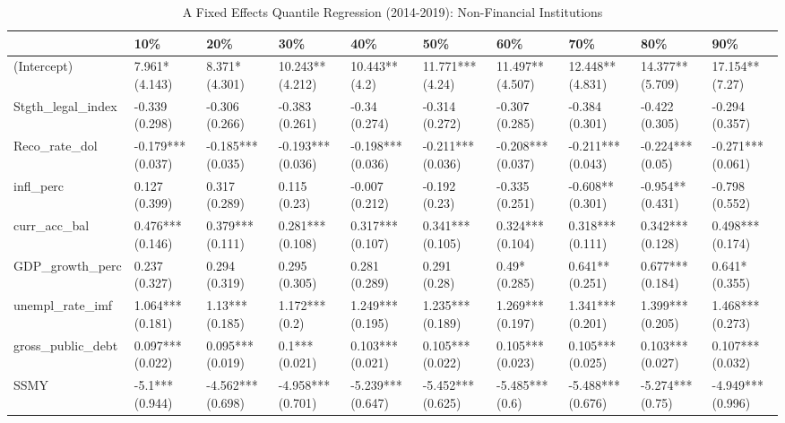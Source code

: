 \begin{table}[ht]
\centering
\caption{A Fixed Effects Quantile Regression (2014-2019): Non-Financial Institutions} 
\begingroup\small
\begin{tabular}{llllllllll}
  \toprule
 & 10\% & 20\% & 30\% & 40\% & 50\% & 60\% & 70\% & 80\% & 90\% \\ 
  \midrule
(Intercept) & 7.961* (4.143) & 8.371* (4.301) & 10.243** (4.212) & 10.443** (4.2) & 11.771*** (4.24) & 11.497** (4.507) & 12.448** (4.831) & 14.377** (5.709) & 17.154** (7.27) \\ 
  Stgth\_legal\_index & -0.339 (0.298) & -0.306 (0.266) & -0.383 (0.261) & -0.34 (0.274) & -0.314 (0.272) & -0.307 (0.285) & -0.384 (0.301) & -0.422 (0.305) & -0.294 (0.357) \\ 
  Reco\_rate\_dol & -0.179*** (0.037) & -0.185*** (0.035) & -0.193*** (0.036) & -0.198*** (0.036) & -0.211*** (0.036) & -0.208*** (0.037) & -0.211*** (0.043) & -0.224*** (0.05) & -0.271*** (0.061) \\ 
  infl\_perc & 0.127 (0.399) & 0.317 (0.289) & 0.115 (0.23) & -0.007 (0.212) & -0.192 (0.23) & -0.335 (0.251) & -0.608** (0.301) & -0.954** (0.431) & -0.798 (0.552) \\ 
  curr\_acc\_bal & 0.476*** (0.146) & 0.379*** (0.111) & 0.281*** (0.108) & 0.317*** (0.107) & 0.341*** (0.105) & 0.324*** (0.104) & 0.318*** (0.111) & 0.342*** (0.128) & 0.498*** (0.174) \\ 
  GDP\_growth\_perc & 0.237 (0.327) & 0.294 (0.319) & 0.295 (0.305) & 0.281 (0.289) & 0.291 (0.28) & 0.49* (0.285) & 0.641** (0.251) & 0.677*** (0.184) & 0.641* (0.355) \\ 
  unempl\_rate\_imf & 1.064*** (0.181) & 1.13*** (0.185) & 1.172*** (0.2) & 1.249*** (0.195) & 1.235*** (0.189) & 1.269*** (0.197) & 1.341*** (0.201) & 1.399*** (0.205) & 1.468*** (0.273) \\ 
  gross\_public\_debt & 0.097*** (0.022) & 0.095*** (0.019) & 0.1*** (0.021) & 0.103*** (0.021) & 0.105*** (0.022) & 0.105*** (0.023) & 0.105*** (0.025) & 0.103*** (0.027) & 0.107*** (0.032) \\ 
  SSMY & -5.1*** (0.944) & -4.562*** (0.698) & -4.958*** (0.701) & -5.239*** (0.647) & -5.452*** (0.625) & -5.485*** (0.6) & -5.488*** (0.676) & -5.274*** (0.75) & -4.949*** (0.996) \\ 
   \bottomrule
\end{tabular}
\endgroup
\end{table}
